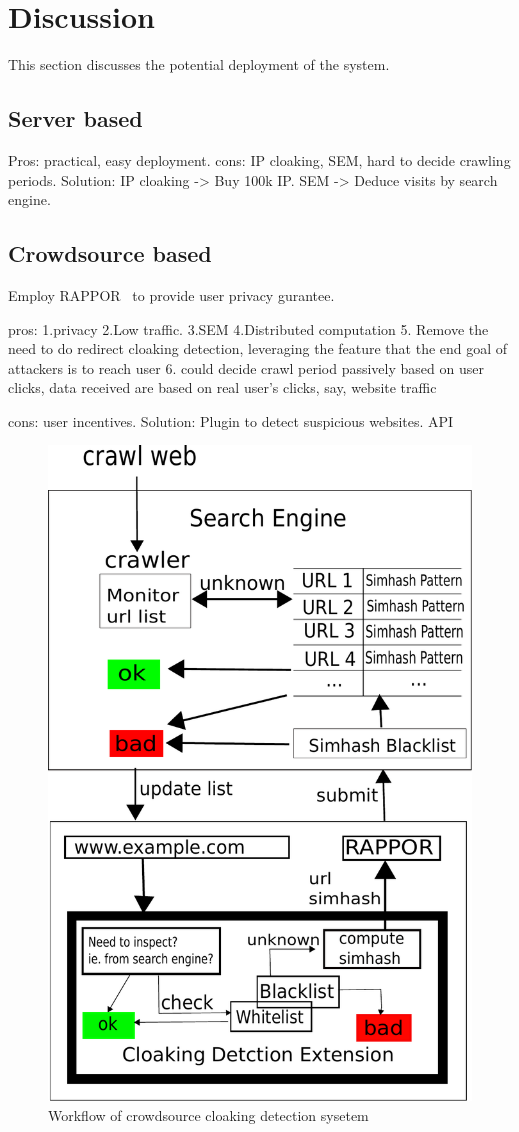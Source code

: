 \section{Discussion}
\label{s:discussion}

This section discusses the potential deployment of the system.
\subsection{Server based}

Pros:	practical, easy deployment.
cons:	IP cloaking, SEM, hard to decide crawling periods. 
Solution: IP cloaking -> Buy 100k IP.
SEM -> Deduce visits by search engine. 

\subsection{Crowdsource based}
Employ RAPPOR~\cite{erlingsson2014rappor} to provide user privacy gurantee.

pros: 	1.privacy 2.Low traffic. 3.SEM 4.Distributed computation 
5. Remove the need to do redirect cloaking detection, leveraging the feature
that the end goal of attackers is to reach user
6. could decide crawl period passively based on user clicks, data received are
based on real user’s clicks, say, website traffic

cons: user incentives. 
Solution: Plugin to detect suspicious websites. API


\begin{figure}[t]
  \centering
  \includegraphics[width=.5\textwidth]{fig/workflow}
  \caption{Workflow of crowdsource cloaking detection sysetem}
  \label{fig:workflow}
\end{figure}


